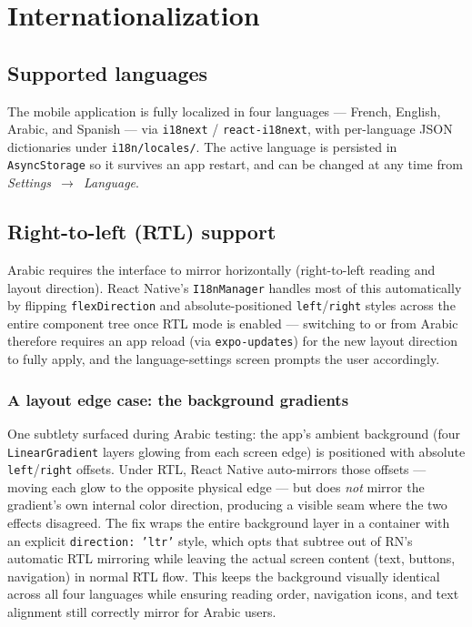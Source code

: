 \documentclass[a4paper,12pt]{report}
\begin{document}
\chapter{Internationalization}
\label{chap:i18n}

\section{Supported languages}
The mobile application is fully localized in four languages --- French,
English, Arabic, and Spanish --- via \texttt{i18next} /
\texttt{react-i18next}, with per-language JSON dictionaries under
\texttt{i18n/locales/}. The active language is persisted in
\texttt{AsyncStorage} so it survives an app restart, and can be changed at
any time from \emph{Settings~$\rightarrow$~Language}.

\section{Right-to-left (RTL) support}
Arabic requires the interface to mirror horizontally (right-to-left
reading and layout direction). React Native's \texttt{I18nManager} handles
most of this automatically by flipping \texttt{flexDirection} and
absolute-positioned \texttt{left}/\texttt{right} styles across the entire
component tree once RTL mode is enabled --- switching to or from Arabic
therefore requires an app reload (via \texttt{expo-updates}) for the new
layout direction to fully apply, and the language-settings screen prompts
the user accordingly.

\subsection{A layout edge case: the background gradients}
One subtlety surfaced during Arabic testing: the app's ambient background
(four \texttt{LinearGradient} layers glowing from each screen edge) is
positioned with absolute \texttt{left}/\texttt{right} offsets. Under RTL,
React Native auto-mirrors those offsets --- moving each glow to the
opposite physical edge --- but does \emph{not} mirror the gradient's own
internal color direction, producing a visible seam where the two effects
disagreed. The fix wraps the entire background layer in a container with
an explicit \texttt{direction: 'ltr'} style, which opts that subtree out
of RN's automatic RTL mirroring while leaving the actual screen content
(text, buttons, navigation) in normal RTL flow. This keeps the background
visually identical across all four languages while ensuring reading order,
navigation icons, and text alignment still correctly mirror for Arabic
users.
\end{document}
